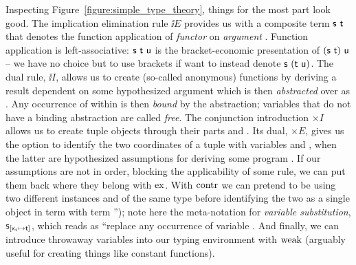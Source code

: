 Inspecting Figure~\ref{figure:simple_type_theory}, things for the most part look good.
The implication elimination rule $\ii E$ provides us with a composite term $\mathsf{s~t}$ that denotes the function application of \textit{functor}  on \textit{argument} .
Function application is left-associative: $\mathsf{s~t~u}$ is the bracket-economic presentation of $(\mathsf{s~t})~\mathsf{u}$ -- we have no choice but to use brackets if want to instead denote $\mathsf{s}~(\mathsf{t~u})$.
The dual rule, $\ii I$, allows us to create (so-called anonymous) functions by deriving a result  dependent on some hypothesized argument \term{\vari } which is then \textit{abstracted} over as .
Any occurrence of \smallterm{\vari } within  is then \textit{bound} by the abstraction; variables that do not have a binding abstraction are called \textit{free}.
The conjunction introduction $\times I$ allows us to create tuple objects  through their parts  and .
Its dual, $\times E$, gives us the option to identify the two coordinates of a tuple  with variables \smallterm{\vari } and \smallterm{\varj}, when the latter are hypothesized assumptions for deriving some program .
If our assumptions are not in order, blocking the applicability of some rule, we can put them back where they belong with $\mathrm{ex}{}$.
With $\mathrm{contr}{}$ we can pretend to be using two different instances \smallterm{\vari } and \smallterm{\varj} of the same type before identifying the two as a single object \term{\vari } in term  with term '');
note here the meta-notation for \textit{variable substitution}, $\mathsf{s}_{[\mathsf{\mathsf{x}_{\mathnormal{i}} } \mapsto \mathsf{t}]}$, which reads as ``replace any occurrence of variable \term{\vari }.
And finally, we can introduce throwaway variables into our typing environment with $\mathrm{weak}{}$ (arguably useful for creating things like constant functions).

